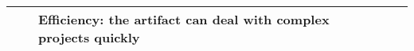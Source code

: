 \begin{longtable}[c]{@{}p{1cm}p{2.5cm}p{5cm}p{3cm}p{4cm}@{}}
                  &                                                & Efficiency: the artifact can deal with complex projects quickly                                                                                                                                                                                                          &                                                                                                                                                      &                                                                                                                               \\* \bottomrule
\end{longtable}